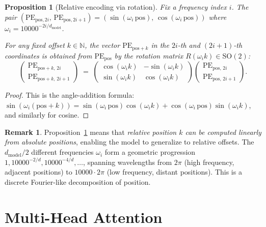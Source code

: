 \documentclass[11pt]{amsart}
\theoremstyle{plain}
\newtheorem{proposition}[theorem]{Proposition}
\theoremstyle{definition}
\newtheorem{remark}[theorem]{Remark}
\newcommand{\N}{\mathbb{N}}
\begin{document}
\begin{proposition}[Relative encoding via rotation]
\label{prop:pe-rotation}
Fix a frequency index $i$.  The pair
$(\mathrm{PE}_{\mathrm{pos},2i},\, \mathrm{PE}_{\mathrm{pos},2i+1})
= (\sin(\omega_i \,\mathrm{pos}),\, \cos(\omega_i \,\mathrm{pos}))$
where $\omega_i = 10000^{-2i/d_{\mathrm{model}}}$.

For any fixed offset $k \in \N$, the vector $\mathrm{PE}_{\mathrm{pos}+k}$
in the $2i$-th and $(2i+1)$-th coordinates is obtained from $\mathrm{PE}_{\mathrm{pos}}$
by the rotation matrix $R(\omega_i k) \in \mathrm{SO}(2)$:
\[
    \begin{pmatrix}
        \mathrm{PE}_{\mathrm{pos}+k,\,2i} \\
        \mathrm{PE}_{\mathrm{pos}+k,\,2i+1}
    \end{pmatrix}
    \;=\;
    \begin{pmatrix}
        \cos(\omega_i k) & -\sin(\omega_i k) \\
        \sin(\omega_i k) &  \cos(\omega_i k)
    \end{pmatrix}
    \begin{pmatrix}
        \mathrm{PE}_{\mathrm{pos},\,2i} \\
        \mathrm{PE}_{\mathrm{pos},\,2i+1}
    \end{pmatrix}.
\]
\end{proposition}
\begin{proof}
This is the angle-addition formula: $\sin(\omega_i(\mathrm{pos}+k))
= \sin(\omega_i \,\mathrm{pos})\cos(\omega_i k)
+ \cos(\omega_i \,\mathrm{pos})\sin(\omega_i k)$, and similarly for cosine.
\end{proof}

\begin{remark}
Proposition~\ref{prop:pe-rotation} means that \emph{relative position $k$
can be computed linearly from absolute positions}, enabling the model to
generalize to relative offsets.  The $d_{\mathrm{model}}/2$ different
frequencies $\omega_i$ form a geometric progression $1, 10000^{-2/d},
10000^{-4/d}, \ldots$, spanning wavelengths from $2\pi$ (high frequency,
adjacent positions) to $10000 \cdot 2\pi$ (low frequency, distant positions).
This is a discrete Fourier-like decomposition of position.
\end{remark}

\section{Multi-Head Attention}
\label{sec:mha}
\end{document}
